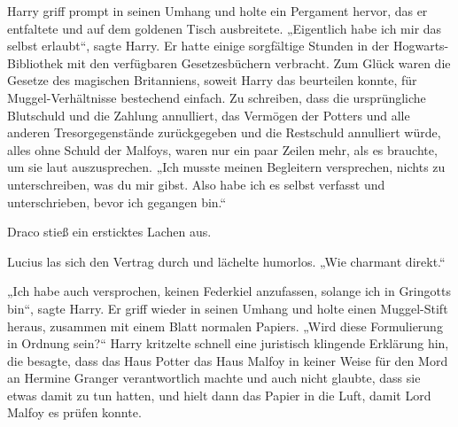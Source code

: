 Harry griff prompt in seinen Umhang und holte ein Pergament hervor, das er entfaltete und auf dem goldenen Tisch ausbreitete.
„Eigentlich habe ich mir das selbst erlaubt“, sagte Harry.
Er hatte einige sorgfältige Stunden in der Hogwarts-Bibliothek mit den verfügbaren Gesetzesbüchern verbracht. Zum Glück waren die Gesetze des magischen Britanniens, soweit Harry das beurteilen konnte, für Muggel-Verhältnisse bestechend einfach. Zu schreiben, dass die ursprüngliche Blutschuld und die Zahlung annulliert, das Vermögen der Potters und alle anderen Tresorgegenstände zurückgegeben und die Restschuld annulliert würde, alles ohne Schuld der Malfoys, waren nur ein paar Zeilen mehr, als es brauchte, um sie laut auszusprechen.
„Ich musste meinen Begleitern versprechen, nichts zu unterschreiben, was du mir gibst. Also habe ich es selbst verfasst und unterschrieben, bevor ich gegangen bin.“

Draco stieß ein ersticktes Lachen aus.

Lucius las sich den Vertrag durch und lächelte humorlos.
„Wie charmant direkt.“

„Ich habe auch versprochen, keinen Federkiel anzufassen, solange ich in Gringotts bin“, sagte Harry. Er griff wieder in seinen Umhang und holte einen Muggel-Stift heraus, zusammen mit einem Blatt normalen Papiers. „Wird diese Formulierung in Ordnung sein?“
Harry kritzelte schnell eine juristisch klingende Erklärung hin, die besagte, dass das Haus Potter das Haus Malfoy in keiner Weise für den Mord an Hermine Granger verantwortlich machte und auch nicht glaubte, dass sie etwas damit zu tun hatten, und hielt dann das Papier in die Luft, damit Lord Malfoy es prüfen konnte.

